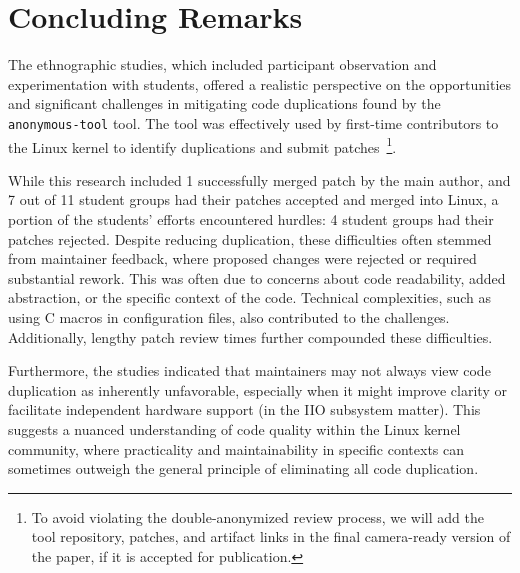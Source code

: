 \documentclass[10pt,conference]{IEEEtran}
\begin{document}
\section{Concluding Remarks}

The ethnographic studies, which included participant observation and experimentation with students, offered a realistic perspective on the opportunities and significant challenges in mitigating code duplications found by the \texttt{anonymous-tool} tool. The tool was effectively used by first-time contributors to the Linux kernel to identify duplications and submit patches~\footnote{To avoid violating the double-anonymized review process, we will add the tool repository, patches, and artifact links in the final camera-ready version of the paper, if it is accepted for publication.}.

While this research included 1 successfully merged patch by the main author, and 7 out of 11 student groups had their patches accepted and merged into Linux, a portion of the students' efforts encountered hurdles: 4 student groups had their patches rejected.
Despite reducing duplication, these difficulties often stemmed from maintainer feedback, where proposed changes were rejected or required substantial rework. This was often due to concerns about code readability, added abstraction, or the specific context of the code. Technical complexities, such as using C macros in configuration files, also contributed to the challenges. Additionally, lengthy patch review times further compounded these difficulties.

Furthermore, the studies indicated that maintainers may not always view code duplication as inherently unfavorable, especially when it might improve clarity or facilitate independent hardware support (in the IIO subsystem matter). This suggests a nuanced understanding of code quality within the Linux kernel community, where practicality and maintainability in specific contexts can sometimes outweigh the general principle of eliminating all code duplication.






\end{document}
